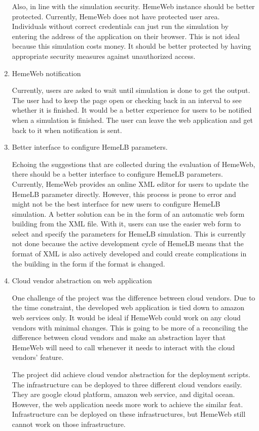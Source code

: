\begin{enumerate}
  Also, in line with the simulation security. HemeWeb instance should be better protected. Currently, HemeWeb does not have protected user area. Individuals without correct credentials can just run the simulation by entering the address of the application on their browser. This is not ideal because this simulation costs money. It should be better protected by having appropriate security measures against unauthorized access.

   \item HemeWeb notification

   Currently, users are asked to wait until simulation is done to get the output. The user had to keep the page open or checking back in an interval to see whether it is finished. It would be a better experience for users to be notified when a simulation is finished. The user can leave the web application and get back to it when notification is sent.


   \item Better interface to configure HemeLB parameters. 

      Echoing the suggestions that are collected during the evaluation of HemeWeb, there should be a better interface to configure HemeLB parameters. Currently, HemeWeb provides an online XML editor for users to update the HemeLB parameter directly. However, this process is prone to error and might not be the best interface for new users to configure HemeLB simulation. A better solution can be in the form of an automatic web form building from the XML file. With it, users can use the easier web form to select and specify the parameters for HemeLB simulation. This is currently not done because the active development cycle of HemeLB means that the format of XML is also actively developed and could create complications in the building in the form if the format is changed.
    
    \item Cloud vendor abstraction on web application
    
    One challenge of the project was the difference between cloud vendors. Due to the time constraint, the developed web application is tied down to amazon web services only. It would be ideal if HemeWeb could work on any cloud vendors with minimal changes. This is going to be more of a reconciling the difference between cloud vendors and make an abstraction layer that HemeWeb will need to call whenever it needs to interact with the cloud vendors' feature.
    
    The project did achieve cloud vendor abstraction for the deployment scripts. The infrastructure can be deployed to three different cloud vendors easily. They are google cloud platform, amazon web service, and digital ocean. However, the web application needs more work to achieve the similar feat. Infrastructure can be deployed on these infrastructures, but HemeWeb still cannot work on those infrastructure.
    

\end{enumerate}
